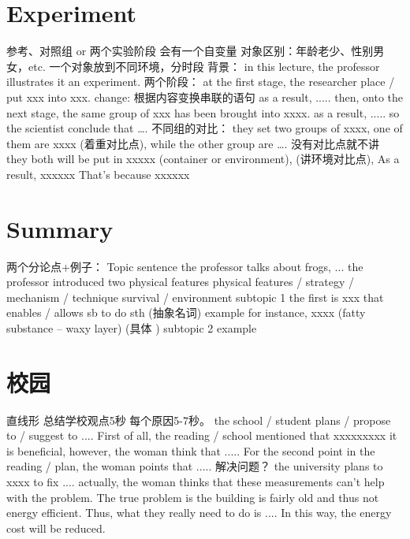 \documentclass{ctexart}
\begin{document}
\section{Experiment}
\begin{outline}
    \1 参考、对照组 or 两个实验阶段
        \2 会有一个自变量
        \2 对象区别：年龄老少、性别男女，etc.
        \2 一个对象放到不同环境，分时段
    \1 背景：
        \2 in this lecture, the professor illustrates it an experiment.
    \1 两个阶段：
        \2 at the first stage, the researcher place / put xxx into xxx.
        \2 change: 根据内容变换串联的语句
        \2 as a result, .....
        \2 then, onto the next stage, the same group of xxx has been brought into xxxx.
        \2 as a result, .....
        \2 so the scientist conclude that \dots.
    \1 不同组的对比：
        \2 they set two groups of xxxx, one of them are xxxx (着重对比点), while the other group are \dots. 没有对比点就不讲
        \2 they both will be put in xxxxx (container or environment), (讲环境对比点),
        \2 As a result, xxxxxx
        \2 That's because xxxxxx

\end{outline}
\section{Summary}
\begin{outline}
    \1 两个分论点+例子：
        \2 Topic sentence
            \3 the professor talks about frogs, ...
            \3 the professor introduced two physical features 
            \3 physical features / strategy / mechanism / technique
            \3 survival / environment
        \2 subtopic 1
            \3 the first is xxx that enables / allows sb to do sth  (抽象名词)
        \2 example
            \3 for instance, xxxx (fatty substance -- waxy layer) (具体 )
        \2 subtopic 2
        \2 example
\end{outline}

\section{校园}
\begin{outline}
    \1 直线形
        \2 总结学校观点5秒
        \2 每个原因5-7秒。
        \2 the school / student plans / propose to / suggest to ....
        \2 First of all, the reading / school  mentioned that xxxxxxxxx it is beneficial, however, the woman think that .....
        \2 For the second point in the reading / plan, the woman points that ..... 
    \1 解决问题？
        \2 the university plans to xxxx to fix ....
        \2 actually, the woman thinks that these measurements can't help with the problem.
        \2 The true problem is the building is fairly old and thus not energy efficient. 
        \2 Thus, what they really need to do is ....
        \2 In this way, the energy cost will be reduced.

\end{outline}
\end{document}

